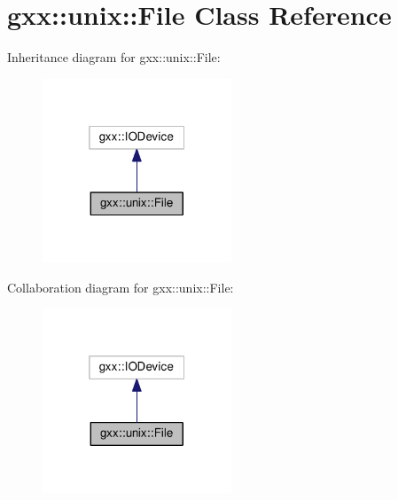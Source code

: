 \hypertarget{classgxx_1_1unix_1_1File}{}\section{gxx\+:\+:unix\+:\+:File Class Reference}
\label{classgxx_1_1unix_1_1File}


Inheritance diagram for gxx\+:\+:unix\+:\+:File\+:
\nopagebreak
\begin{figure}[H]
\begin{center}
\leavevmode
\includegraphics[width=160pt]{classgxx_1_1unix_1_1File__inherit__graph}
\end{center}
\end{figure}


Collaboration diagram for gxx\+:\+:unix\+:\+:File\+:
\nopagebreak
\begin{figure}[H]
\begin{center}
\leavevmode
\includegraphics[width=160pt]{classgxx_1_1unix_1_1File__coll__graph}
\end{center}
\end{figure}
